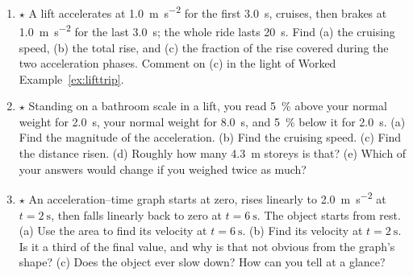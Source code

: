 \documentclass[11pt,twoside,openany]{book}
\begin{document}
\begin{enumerate}[label=\textbf{\thechapter.\arabic*},resume=exercises,leftmargin=*]
  \item $\star$ A lift accelerates at \SI{1.0}{\metre\per\second\squared} for the first \SI{3.0}{\second}, cruises, then brakes at \SI{1.0}{\metre\per\second\squared} for the last \SI{3.0}{\second}; the whole ride lasts \SI{20}{\second}. Find (a) the cruising speed, (b) the total rise, and (c) the fraction of the rise covered during the two acceleration phases. Comment on (c) in the light of Worked Example~\ref{ex:lifttrip}.
  \item $\star$ Standing on a bathroom scale in a lift, you read \SI{5}{\percent} above your normal weight for \SI{2.0}{\second}, your normal weight for \SI{8.0}{\second}, and \SI{5}{\percent} below it for \SI{2.0}{\second}. (a) Find the magnitude of the acceleration. (b) Find the cruising speed. (c) Find the distance risen. (d) Roughly how many \SI{4.3}{\metre} storeys is that? (e) Which of your answers would change if you weighed twice as much?
  \item $\star$ An acceleration--time graph starts at zero, rises linearly to \SI{2.0}{\metre\per\second\squared} at $t = \SI{2}{\second}$, then falls linearly back to zero at $t = \SI{6}{\second}$. The object starts from rest. (a) Use the area to find its velocity at $t = \SI{6}{\second}$. (b) Find its velocity at $t = \SI{2}{\second}$. Is it a third of the final value, and why is that not obvious from the graph's shape? (c) Does the object ever slow down? How can you tell at a glance?\label{ex:atgraph}
\end{enumerate}
\end{document}
